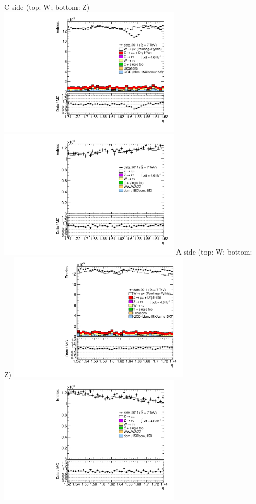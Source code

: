  {
\colb[T]
C-side (top: W; bottom: Z)
\centering
\includegraphics[width=0.66\textwidth]{dates/20130306/figures/both/W_8_C_stack_l_eta_POS} \\
\includegraphics[width=0.66\textwidth]{dates/20130306/figures/both/Z_8_C_stack_lP_eta_ALL.pdf}
A-side (top: W; bottom: Z)
\centering
\includegraphics[width=0.66\textwidth]{dates/20130306/figures/both/W_8_A_stack_l_eta_POS} \\
\includegraphics[width=0.66\textwidth]{dates/20130306/figures/both/Z_8_A_stack_lP_eta_ALL.pdf} 
\cole
}
